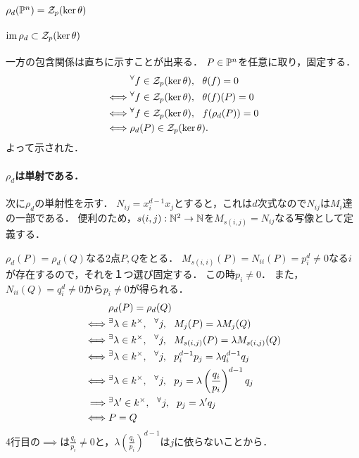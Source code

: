\documentclass[a4paper]{jsarticle}
\begin{document}
    \subsection{$\rho_d(\mathbb{P}^n)=\mathcal{Z}_p(\ker \theta)$}
    \paragraph{$\operatorname{im} \rho_d \subset \mathcal{Z}_p(\ker \theta)$}
    一方の包含関係は直ちに示すことが出来る．
    $P \in \mathbb{P}^n$を任意に取り，固定する．
    \begin{align*}
        {}&     {}^{\forall} f \in \mathcal{Z}_p(\ker \theta),~~ \theta(f)=0 \\
        \iff&   {}^{\forall} f \in \mathcal{Z}_p(\ker \theta),~~ \theta(f)(P)=0 \\
        \iff&   {}^{\forall} f \in \mathcal{Z}_p(\ker \theta),~~ f(\rho_d(P))=0 \\
        \iff&   \rho_d(P) \in \mathcal{Z}_p(\ker \theta).
    \end{align*}
    よって示された．

    \paragraph{$\rho_d$は単射である．}
    次に$\rho_d$の単射性を示す．
    $N_{ij}=x_i^{d-1} x_j$とすると，これは$d$次式なので$N_{ij}$は$M_i$達の一部である．
    便利のため，$s(i,j):\mathbb{N}^2 \to \mathbb{N}$を$M_{s(i,j)}=N_{ij}$なる写像として定義する．

    $\rho_d(P)=\rho_d(Q)$なる2点$P,Q$をとる．
    $M_{s(i,i)}(P)=N_{ii}(P)=p_i^d \neq 0$なる$i$が存在するので，それを１つ選び固定する．
    この時$p_i \neq 0$．
    また，$N_{ii}(Q)=q_i^d \neq 0$から$p_i \neq 0$が得られる．
    \begin{align*}
    {}&         \rho_d(P)=\rho_d(Q) \\
    \iff&       {}^{\exists} \lambda \in k^{\times},~~ {}^{\forall} j,~~ M_j(P)=\lambda M_j(Q) \\
    \iff&       {}^{\exists} \lambda \in k^{\times},~~ {}^{\forall} j,~~ M_{s(i,j)}(P)=\lambda M_{s(i,j)}(Q) \\
    \iff&       {}^{\exists} \lambda \in k^{\times},~~ {}^{\forall} j,~~ p_i^{d-1}p_j=\lambda q_i^{d-1}q_j \\
    \iff&       {}^{\exists} \lambda \in k^{\times},~~ {}^{\forall} j,~~ p_j=\lambda \left(\frac{q_i}{p_i} \right)^{d-1}q_j \\
    \implies&   {}^{\exists} \lambda' \in k^{\times},~~ {}^{\forall} j,~~ p_j=\lambda' q_j \\
    \iff&       P=Q
    \end{align*}
    4行目の$\implies$は$\frac{q_i}{p_i} \neq 0$と，$\lambda \left(\frac{q_i}{p_i} \right)^{d-1}$は$j$に依らないことから．
\end{document}
